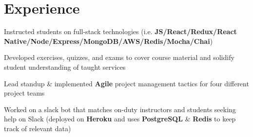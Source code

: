 \documentclass[letterpaper]{deedy-resume} %
\begin{document}
\begin{minipage}[t]{0.66\textwidth} %


  

  \section{Experience}



  \vspace{3mm}
  \begin{tightitemize}
  \item Instructed students on full-stack technologies (i.e. \textbf{JS/React/Redux/React Native/Node/Express/MongoDB/AWS/Redis/Mocha/Chai})
  \item Developed exercises, quizzes, and exams to cover course material and solidify student understanding of taught services
  \item Lead standup \& implemented \textbf{Agile} project management tactics for four different project teams
  \item Worked on a slack bot that matches on-duty instructors and students seeking help on Slack (deployed on \textbf{Heroku} and uses \textbf{PostgreSQL} \& \textbf{Redis} to keep track of relevant data)
  \end{tightitemize}

  \sectionspace %



\end{minipage}
\end{document}
